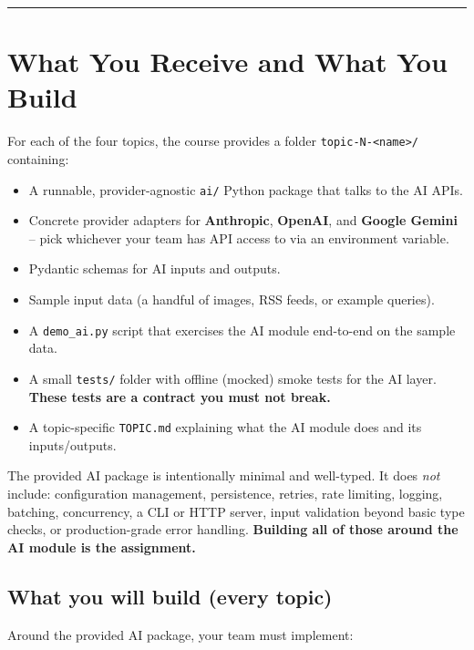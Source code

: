 \documentclass[11pt,a4paper]{article}
\newcommand{\warn}[1]{\textcolor{accent2}{\textbf{#1}}}
\begin{document}
\tableofcontents
\vspace{0.6em}\hrule\vspace{0.4em}

\section{What You Receive and What You Build}

For each of the four topics, the course provides a folder \texttt{topic-N-<name>/} containing:

\begin{itemize}[topsep=2pt,itemsep=1pt]
  \item A runnable, provider-agnostic \texttt{ai/} Python package that talks to the AI APIs.
  \item Concrete provider adapters for \textbf{Anthropic}, \textbf{OpenAI}, and \textbf{Google Gemini} -- pick whichever your team has API access to via an environment variable.
  \item Pydantic schemas for AI inputs and outputs.
  \item Sample input data (a handful of images, RSS feeds, or example queries).
  \item A \texttt{demo\_ai.py} script that exercises the AI module end-to-end on the sample data.
  \item A small \texttt{tests/} folder with offline (mocked) smoke tests for the AI layer. \warn{These tests are a contract you must not break.}
  \item A topic-specific \texttt{TOPIC.md} explaining what the AI module does and its inputs/outputs.
\end{itemize}

\begin{warnbox}
The provided AI package is intentionally minimal and well-typed. It does \emph{not} include: configuration management, persistence, retries, rate limiting, logging, batching, concurrency, a CLI or HTTP server, input validation beyond basic type checks, or production-grade error handling. \textbf{Building all of those around the AI module is the assignment.}
\end{warnbox}

\subsection{What you will build (every topic)}
Around the provided AI package, your team must implement:
\end{document}
